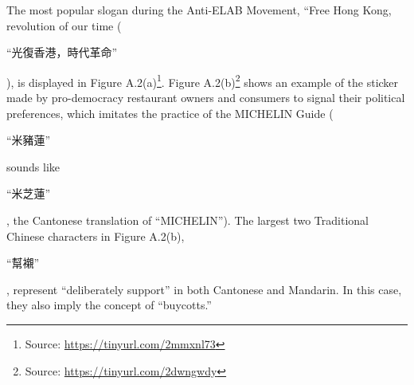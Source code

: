 \documentclass[letterpaper, 12pt]{article}
\begin{document}
\begin{appendices}
\begin{figure}[!h]
    \centering
    \qquad
    \label{fig:sidebyside}
\end{figure}
The most popular slogan during the Anti-ELAB Movement, ``Free Hong Kong, revolution of our time (\begin{CJK*}{UTF8}{bkai}``光復香港，時代革命''\end{CJK*}), is displayed in Figure A.2(a)\footnote{Source: \url{https://tinyurl.com/2mmxnl73}}. Figure A.2(b)\footnote{Source: \url{https://tinyurl.com/2dwngwdy}} shows an example of the sticker made by pro-democracy restaurant owners and consumers to signal their political preferences, which imitates the practice of the MICHELIN Guide (\begin{CJK*}{UTF8}{bkai}``米豬蓮''\end{CJK*} sounds like \begin{CJK*}{UTF8}{bkai}``米芝蓮''\end{CJK*}, the Cantonese translation of ``MICHELIN''). The largest two Traditional Chinese characters in Figure A.2(b), \begin{CJK*}{UTF8}{bkai}``幫襯''\end{CJK*}, represent ``deliberately support'' in both Cantonese and Mandarin. In this case, they also imply the concept of ``buycotts.'' 




\end{appendices}
\end{document}
